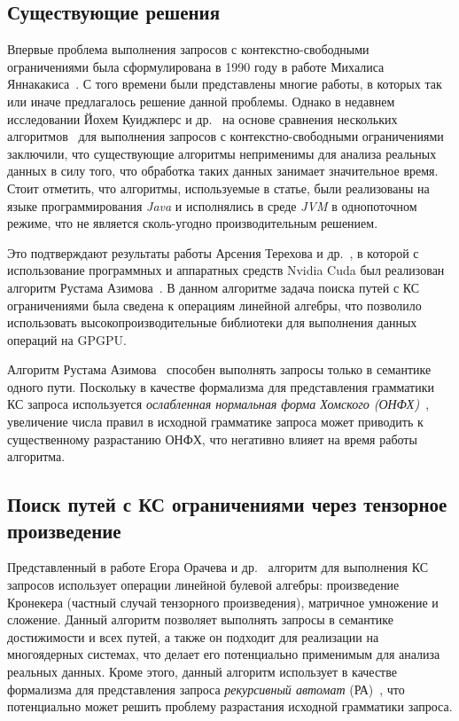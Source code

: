 \subsection{Существующие решения}

Впервые проблема выполнения запросов с контекстно-свободными ограничениями была сформулирована в 1990 году в работе Михалиса Яннакакиса~\cite{inproceedings:yannakakis_cfpq_problem}. С того времени были представлены многие работы, в которых так или иначе предлагалось решение данной проблемы. Однако в недавнем исследовании Йохем Куиджперс и др.~\cite{article:kuijpers_cfpq_exp_compare} на основе сравнения нескольких алгоритмов~\cite{article:hellings_cfpq,inproceedings:matrix_cfpq,inbook:santos_cfpq_lr_analysis} для выполнения запросов с контекстно-свободными ограничениями заключили, что существующие алгоритмы неприменимы для анализа реальных данных в силу того, что обработка таких данных занимает значительное время. Стоит отметить, что алгоритмы, используемые в статье, были реализованы на языке программирования \textit{Java} и исполнялись в среде \textit{JVM} в однопоточном режиме, что не является сколь-угодно производительным решением.

Это подтверждают результаты работы Арсения Терехова и др.~\cite{inproceedings:cfqp_matrix_with_single_source}, в которой с использование программных и аппаратных средств Nvidia Cuda был реализован алгоритм Рустама Азимова~\cite{inproceedings:matrix_cfpq}. В данном алгоритме задача поиска путей с КС ограничениями была сведена к операциям линейной алгебры, что позволило использовать высокопроизводительные библиотеки для выполнения данных операций на GPGPU.

Алгоритм Рустама Азимова~\cite{inproceedings:cfqp_matrix_with_single_source} способен выполнять запросы только в семантике одного пути. Поскольку в качестве формализма для представления грамматики КС запроса используется \textit{ослабленная нормальная форма Хомского (ОНФХ)}~\cite{book:automata_theory}, увеличение числа правил в исходной грамматике запроса может приводить к существенному разрастанию ОНФХ, что негативно влияет на время работы алгоритма.

\subsection{Поиск путей с КС ограничениями через тензорное произведение}

Представленный в работе Егора Орачева и др.~\cite{inbook:kronecker_cfpq_adbis} алгоритм для выполнения КС запросов использует операции линейной булевой алгебры: произведение Кронекера (частный случай тензорного произведения), матричное умножение и сложение. Данный алгоритм позволяет выполнять запросы в семантике достижимости и всех путей, а также он подходит для реализации на многоядерных системах, что делает его потенциально применимым для анализа реальных данных. Кроме этого, данный алгоритм использует в качестве формализма для представления запроса \textit{рекурсивный автомат} (РА)~\cite{article:recursive_state_machines}, что потенциально может решить проблему разрастания исходной грамматики запроса. 

